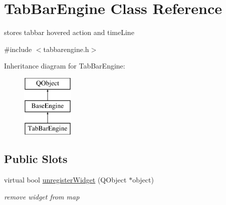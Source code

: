 \hypertarget{class_tab_bar_engine}{}\section{Tab\+Bar\+Engine Class Reference}
\label{class_tab_bar_engine}


stores tabbar hovered action and time\+Line  




{\ttfamily \#include $<$tabbarengine.\+h$>$}

Inheritance diagram for Tab\+Bar\+Engine\+:\begin{figure}[H]
\begin{center}
\leavevmode
\includegraphics[height=3.000000cm]{class_tab_bar_engine}
\end{center}
\end{figure}
\subsection*{Public Slots}
\begin{DoxyCompactItemize}
\item 
\mbox{\label{class_tab_bar_engine_a5ced2eb07be1b9df0f8209d1e7c37497}} 
virtual bool \hyperlink{class_tab_bar_engine_a5ced2eb07be1b9df0f8209d1e7c37497}{unregister\+Widget} (Q\+Object $\ast$object)
\begin{DoxyCompactList}\small\item\em remove widget from map \end{DoxyCompactList}\end{DoxyCompactItemize}
